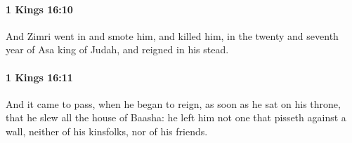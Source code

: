 		\paragraph{1 Kings 16:10} %
			\label{1KINGS-16-10}

			And Zimri went in and smote him, and killed him, in the twenty and seventh year of Asa king of Judah, and reigned in his stead.


		\paragraph{1 Kings 16:11} %
			\label{1KINGS-16-11}

			And it came to pass, when he began to reign, as soon as he sat on his throne, that he slew all the house of Baasha: he left him not one that pisseth against a wall, neither of his kinsfolks, nor of his friends.


